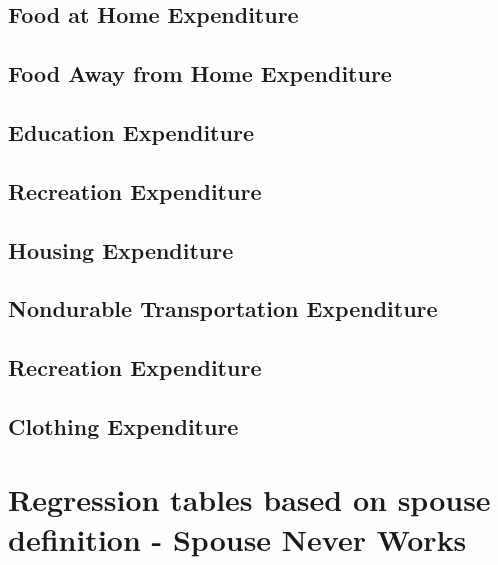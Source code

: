 \documentclass[a4paper,landscape]{article}
\begin{document}
\subsection{Food at Home Expenditure}

\clearpage

\subsection{Food Away from Home Expenditure}

\clearpage

\subsection{Education Expenditure}

\clearpage

\subsection{Recreation Expenditure}

\clearpage

\subsection{Housing Expenditure}

\clearpage

\subsection{Nondurable Transportation Expenditure}

\clearpage

\subsection{Recreation Expenditure}

\clearpage

\subsection{Clothing Expenditure}

\clearpage



\section{Regression tables based on spouse definition - Spouse Never Works}
\end{document}
